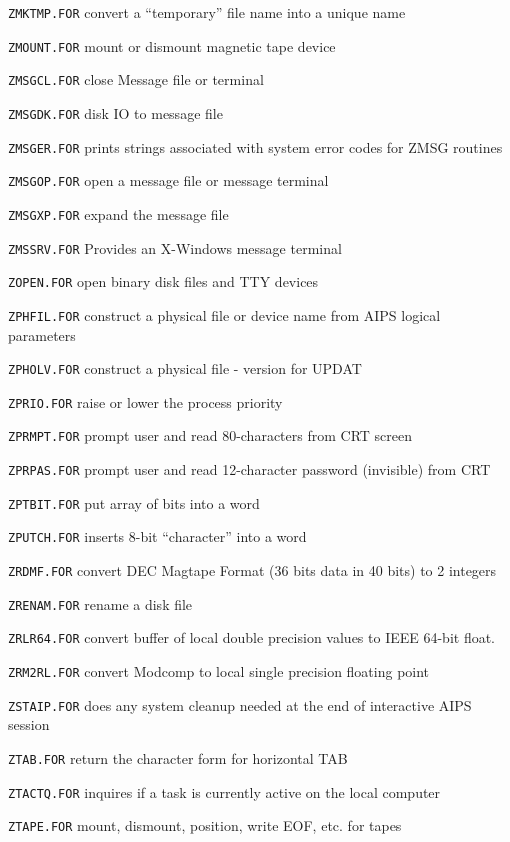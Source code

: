 {\item{\tt ZMKTMP.FOR} convert a ``temporary'' file name into a unique name
\item{\tt ZMOUNT.FOR} mount or dismount magnetic tape device
\item{\tt ZMSGCL.FOR} close Message file or terminal
\item{\tt ZMSGDK.FOR} disk IO to message file
\item{\tt ZMSGER.FOR} prints strings associated with system error codes for ZMSG routines
\item{\tt ZMSGOP.FOR} open a message file or message terminal
\item{\tt ZMSGXP.FOR} expand the message file
\item{\tt ZMSSRV.FOR} Provides an X-Windows message terminal
\item{\tt ZOPEN.FOR} open binary disk files and  TTY devices
\item{\tt ZPHFIL.FOR} construct a physical file or device name from AIPS logical parameters
\item{\tt ZPHOLV.FOR} construct a physical file - version for UPDAT
\item{\tt ZPRIO.FOR} raise or lower the process priority
\item{\tt ZPRMPT.FOR} prompt user and read 80-characters from CRT screen
\item{\tt ZPRPAS.FOR} prompt user and read 12-character password (invisible) from CRT
\item{\tt ZPTBIT.FOR} put array of bits into a word
\item{\tt ZPUTCH.FOR} inserts 8-bit ``character'' into a word
\item{\tt ZRDMF.FOR} convert DEC Magtape Format (36 bits data in 40 bits) to 2 integers
\item{\tt ZRENAM.FOR} rename a disk file
\item{\tt ZRLR64.FOR} convert buffer of local double precision values to IEEE 64-bit float.
\item{\tt ZRM2RL.FOR} convert Modcomp to local single precision floating point
\item{\tt ZSTAIP.FOR} does any system cleanup needed at the end of interactive AIPS session
\item{\tt ZTAB.FOR} return the character form for horizontal TAB
\item{\tt ZTACTQ.FOR} inquires if a task is currently active on the local computer
\item{\tt ZTAPE.FOR} mount, dismount, position, write EOF, etc. for tapes
}
